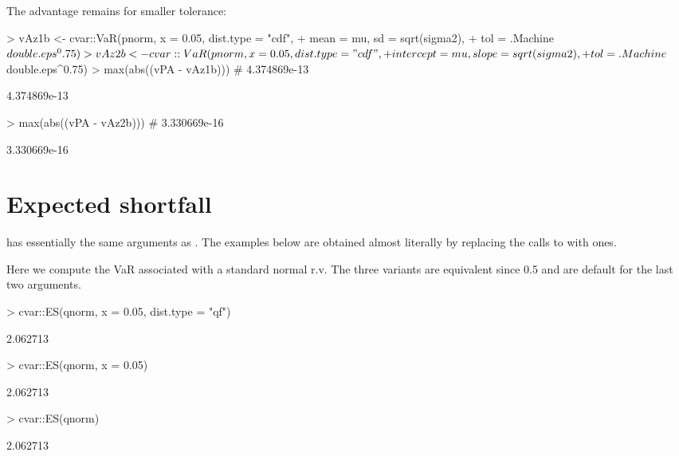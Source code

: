 \documentclass[nojss,article]{jss}
\begin{document}
The advantage remains for smaller tolerance:
\begin{Schunk}
\begin{Sinput}
> vAz1b <- cvar::VaR(pnorm, x = 0.05, dist.type = "cdf",
+                    mean = mu, sd = sqrt(sigma2),
+                    tol = .Machine$double.eps^0.75)
> vAz2b <- cvar::VaR(pnorm, x = 0.05, dist.type = "cdf",
+                    intercept = mu, slope = sqrt(sigma2),
+                    tol = .Machine$double.eps^0.75)
> max(abs((vPA - vAz1b))) # 4.374869e-13
\end{Sinput}
\begin{Soutput}
[1] 4.374869e-13
\end{Soutput}
\begin{Sinput}
> max(abs((vPA - vAz2b))) # 3.330669e-16
\end{Sinput}
\begin{Soutput}
[1] 3.330669e-16
\end{Soutput}
\end{Schunk}


\section{Expected shortfall}
\label{sec:expected-shortfall}

 has essentially the same arguments as . The examples below are obtained
almost literally by replacing the calls to  with  ones. 

Here we compute the VaR associated with a standard normal r.v.
The three variants are equivalent since 0.5 and  are default for the last two arguments.
\begin{Schunk}
\begin{Sinput}
> cvar::ES(qnorm, x = 0.05, dist.type = "qf")
\end{Sinput}
\begin{Soutput}
[1] 2.062713
\end{Soutput}
\begin{Sinput}
> cvar::ES(qnorm, x = 0.05)
\end{Sinput}
\begin{Soutput}
[1] 2.062713
\end{Soutput}
\begin{Sinput}
> cvar::ES(qnorm)
\end{Sinput}
\begin{Soutput}
[1] 2.062713
\end{Soutput}
\end{Schunk}
\end{document}
